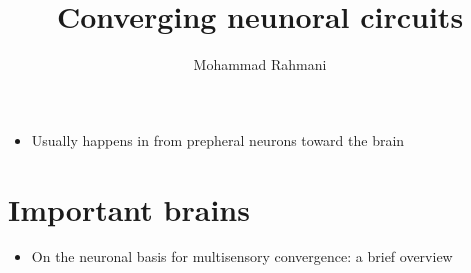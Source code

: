 \documentclass[a4paper]{article}
\title{Converging neunoral circuits}
\date{}
\author{Mohammad Rahmani}
\begin{document}
    \maketitle
    \begin{itemize}
        \item Usually happens in from prepheral neurons toward the brain
    \end{itemize}
    
    \section{Important brains}
    \begin{itemize}
        \item On the neuronal basis for multisensory convergence: a brief overview 
    \end{itemize}
    
    
\end{document}
